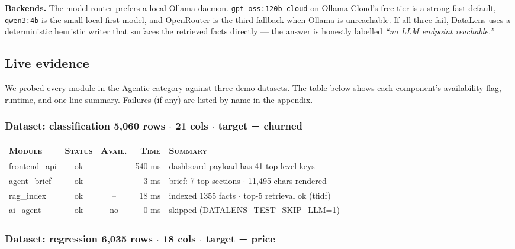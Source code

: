 \documentclass[11pt,a4paper]{article}
\begin{document}
\textbf{Backends.} The model router prefers a local Ollama daemon. \texttt{gpt-oss:120b-cloud} on Ollama Cloud's free tier is a strong fast default, \texttt{qwen3:4b} is the small local-first model, and OpenRouter is the third fallback when Ollama is unreachable. If all three fail, DataLens uses a deterministic heuristic writer that surfaces the retrieved facts directly --- the answer is honestly labelled \emph{``no LLM endpoint reachable.''}

\subsection{Live evidence}

We probed every module in the Agentic category against three
demo datasets. The table below shows each component's availability flag,
runtime, and one-line summary. Failures (if any) are listed by name in the
appendix.


\subsubsection*{Dataset: classification
\hfill {\color{ink3}\footnotesize 5,060 rows
{$\boldsymbol{\cdot}$} 21 cols
{$\boldsymbol{\cdot}$} target = churned}}

\begin{tabularx}{\linewidth}{l c c r X}
\toprule
\textsc{Module} & \textsc{Status} & \textsc{Avail.} & \textsc{Time} & \textsc{Summary} \\
\midrule
frontend\_api & \textcolor{ok}{ok} & -- & 540 ms & dashboard payload has 41 top-level keys \\
agent\_brief & \textcolor{ok}{ok} & -- & 3 ms & brief: 7 top sections $\cdot$ 11,495 chars rendered \\
rag\_index & \textcolor{ok}{ok} & -- & 18 ms & indexed 1355 facts $\cdot$ top-5 retrieval ok (tfidf) \\
ai\_agent & \textcolor{ok}{ok} & \textcolor{ink3}{no} & 0 ms & skipped (DATALENS\_TEST\_SKIP\_LLM=1) \\
\bottomrule
\end{tabularx}


\subsubsection*{Dataset: regression
\hfill {\color{ink3}\footnotesize 6,035 rows
{$\boldsymbol{\cdot}$} 18 cols
{$\boldsymbol{\cdot}$} target = price}}
\end{document}
